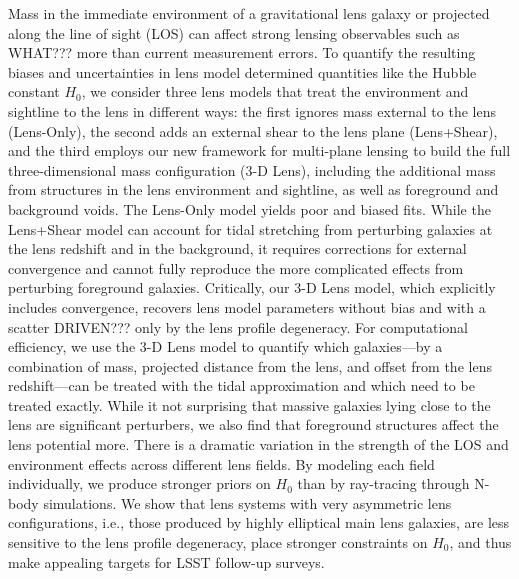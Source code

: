Mass in the immediate environment of a gravitational lens galaxy or projected along the line of sight (LOS) can affect strong lensing observables such as WHAT??? more than current measurement errors. To quantify the resulting biases and uncertainties in lens model determined quantities like the Hubble constant $H_0$, we consider three lens models that treat the environment and sightline to the lens in different ways: the first ignores mass external to the lens (Lens-Only), the second adds an external shear to the lens plane (Lens+Shear), and the third employs our new 
framework for multi-plane lensing \citep{McCully14} to build the full three-dimensional mass configuration (3-D Lens), including the additional mass from structures in the lens environment and sightline, as well as foreground and background voids.  The Lens-Only model yields poor and biased fits.  While the Lens+Shear model can 
account for tidal stretching from perturbing galaxies at the lens redshift and in the background, it requires corrections for external convergence and cannot fully reproduce the more 
complicated effects from perturbing foreground galaxies.  Critically, our 3-D Lens model, which explicitly includes convergence, recovers lens model parameters without bias and with a scatter DRIVEN??? only by the lens profile degeneracy.  For computational efficiency, we use the 3-D Lens model to quantify which galaxies---by a combination of mass, projected distance from the lens, and offset from the lens redshift---can be treated with the tidal approximation and which need to be treated exactly.  While it not surprising that massive galaxies lying close to the lens are significant perturbers, we also find that foreground structures affect the lens potential more.
There is a dramatic variation in the strength of the LOS and environment effects across different lens fields.  By modeling each field 
individually, we produce stronger priors on $H_0$ than by ray-tracing through N-body simulations.  We show that lens systems with very asymmetric lens configurations, i.e., those produced by highly elliptical main lens galaxies, are less sensitive to the lens profile degeneracy, place stronger constraints on $H_0$, and thus make appealing targets for LSST follow-up surveys.
  
  
  